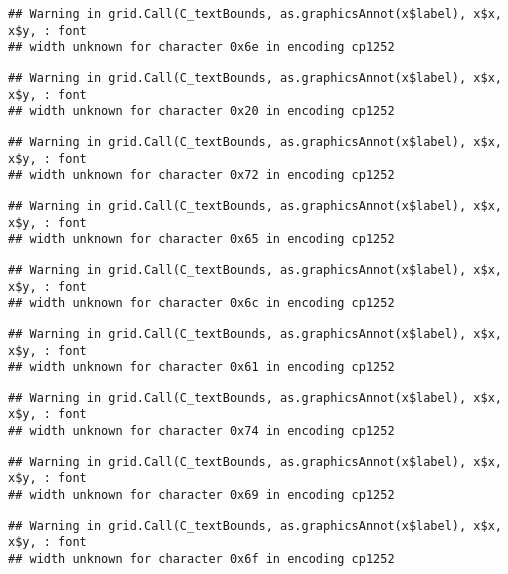 \documentclass[
]{article}
\begin{document}
\begin{verbatim}
## Warning in grid.Call(C_textBounds, as.graphicsAnnot(x$label), x$x, x$y, : font
## width unknown for character 0x6e in encoding cp1252
\end{verbatim}

\begin{verbatim}
## Warning in grid.Call(C_textBounds, as.graphicsAnnot(x$label), x$x, x$y, : font
## width unknown for character 0x20 in encoding cp1252
\end{verbatim}

\begin{verbatim}
## Warning in grid.Call(C_textBounds, as.graphicsAnnot(x$label), x$x, x$y, : font
## width unknown for character 0x72 in encoding cp1252
\end{verbatim}

\begin{verbatim}
## Warning in grid.Call(C_textBounds, as.graphicsAnnot(x$label), x$x, x$y, : font
## width unknown for character 0x65 in encoding cp1252
\end{verbatim}

\begin{verbatim}
## Warning in grid.Call(C_textBounds, as.graphicsAnnot(x$label), x$x, x$y, : font
## width unknown for character 0x6c in encoding cp1252
\end{verbatim}

\begin{verbatim}
## Warning in grid.Call(C_textBounds, as.graphicsAnnot(x$label), x$x, x$y, : font
## width unknown for character 0x61 in encoding cp1252
\end{verbatim}

\begin{verbatim}
## Warning in grid.Call(C_textBounds, as.graphicsAnnot(x$label), x$x, x$y, : font
## width unknown for character 0x74 in encoding cp1252
\end{verbatim}

\begin{verbatim}
## Warning in grid.Call(C_textBounds, as.graphicsAnnot(x$label), x$x, x$y, : font
## width unknown for character 0x69 in encoding cp1252
\end{verbatim}

\begin{verbatim}
## Warning in grid.Call(C_textBounds, as.graphicsAnnot(x$label), x$x, x$y, : font
## width unknown for character 0x6f in encoding cp1252
\end{verbatim}
\end{document}
